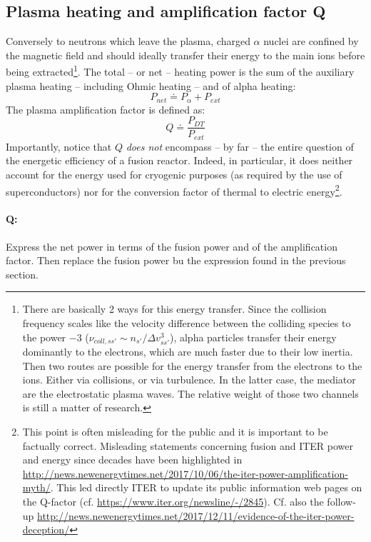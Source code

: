 \subsection{Plasma heating and amplification factor Q}
Conversely to neutrons which leave the plasma, charged $\alpha$ nuclei are confined by the magnetic field and should ideally transfer their energy to the main ions before being extracted\footnote{There are basically 2 ways for this energy transfer. Since the collision frequency scales like the velocity difference between the colliding species to the power $-3$ ($\nu_{coll,ss'}\sim n_{s'}/\Delta v_{ss'}^3$), alpha particles transfer their energy dominantly to the electrons, which are much faster due to their low inertia. Then two routes are possible for the energy transfer from the electrons to the ions. Either via collisions, or via turbulence. In the latter case, the mediator are the electrostatic plasma waves. The relative weight of those two channels is still a matter of research.}. The total -- or net -- heating power is the sum of the auxiliary plasma heating -- including Ohmic heating -- and of alpha heating:
\begin{equation}
P_{net} \doteq P_\alpha + P_{ext}
\label{eq:net_power}
\end{equation}
The plasma amplification factor is defined as:
\begin{equation}
Q \doteq \frac{P_{DT}}{P_{ext}}
\label{eq:Q}
\end{equation}
Importantly, notice that $Q$ \emph{does not} encompass -- by far -- the entire question of the energetic efficiency of a fusion reactor. Indeed, in particular, it does neither account for the energy used for cryogenic purposes (as required by the use of superconductors) nor for the conversion factor of thermal to electric energy\footnote{This point is often misleading for the public and it is important to be factually correct. Misleading statements concerning fusion and ITER power and energy since decades have been highlighted in \url{http://news.newenergytimes.net/2017/10/06/the-iter-power-amplification-myth/}. This led directly ITER to update its public information web pages on the Q-factor (cf. \url{https://www.iter.org/newsline/-/2845}).  Cf. also the follow-up \url{http://news.newenergytimes.net/2017/12/11/evidence-of-the-iter-power-deception/}}.

\paragraph{Q:} Express the net power in terms of the fusion power and of the amplification factor. Then replace the fusion power bu the expression found in the previous section. 



